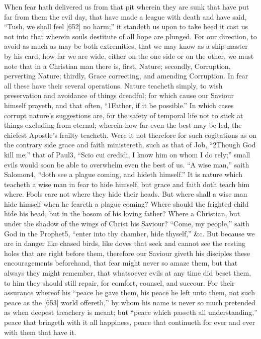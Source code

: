When fear hath delivered us from that pit wherein they are sunk that have put far from them the evil day, that have made a league with death and have said, “Tush, we shall feel [652] no harm;” it standeth us upon to take heed it cast us not into that wherein souls destitute of all hope are plunged. For our direction, to avoid as much as may be both extremities, that we may know as a ship-master by his card, how far we are wide, either on the one side or on the other, we must note that in a Christian man there is, first, Nature; secondly, Corruption, perverting Nature; thirdly, Grace correcting, and amending Corruption. In fear all these have their several operations. Nature teacheth simply, to wish preservation and avoidance of things dreadful; for which cause our Saviour himself prayeth, and that often, “1Father, if it be possible.” In which cases corrupt nature’s suggestions are, for the safety of temporal life not to stick at things excluding from eternal; wherein how far even the best may be led, the chiefest Apostle’s frailty teacheth. Were it not therefore for such cogitations as on the contrary side grace and faith ministereth, such as that of Job, “2Though God kill me;” that of Paul3, “Scio cui credidi, I know him on whom I do rely;” small evils would soon be able to overwhelm even the best of us. “A wise man,” saith Salomon4, “doth see a plague coming, and hideth himself.” It is nature which teacheth a wise man in fear to hide himself, but grace and faith doth teach him where. Fools care not where they hide their heads. But where shall a wise man hide himself when he feareth a plague coming? Where should the frighted child hide his head, but in the bosom of his loving father? Where a Christian, but under the shadow of the wings of Christ his Saviour? “Come, my people,” saith God in the Prophet5, “enter into thy chamber, hide thyself,” &c. But because we are in danger like chased birds, like doves that seek and cannot see the resting holes that are right before them, therefore our Saviour giveth his disciples these encouragements beforehand, that fear might never so amaze them, but that always they might remember, that whatsoever evils at any time did beset them, to him they should still repair, for comfort, counsel, and succour. For their assurance whereof his “peace he gave them, his peace he left unto them, not such peace as the [653] world offereth,” by whom his name is never so much pretended as when deepest treachery is meant; but “peace which passeth all understanding,” peace that bringeth with it all happiness, peace that continueth for ever and ever with them that have it.

